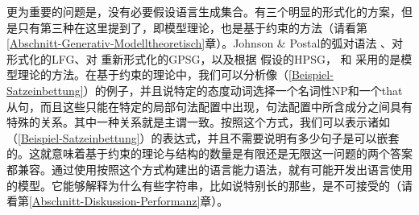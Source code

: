 更为重要的问题是，没有必要假设语言生成集合。有三个明显的形式化的方案，但是只有第三种在这里提到了，即模型理论，也是基于约束的方法（请看第\ref{Abschnitt-Generativ-Modelltheoretisch}章）。Johnson \& Postal的弧对语法
\citeyearpar{JP80a-u}、对 \citet{Kaplan95a}形式化的LFG\indexlfgc、对 \citet{Rogers97a}重新形式化的GPSG\indexgpsg，以及根据 \citet{King99a-u}假设的HPSG\indexhpsgc， \citet{Pollard99a}和 \citet{Richter2007a}采用的是模型理论的方法。在基于约束的理论中，我们可以分析像（\ref{Beispiel-Satzeinbettung}）的例子，并且说特定的态度动词选择一个名词性NP和一个that从句，而且这些只能在特定的局部句法配置中出现，句法配置中所含成分之间具有特殊的关系。其中一种关系就是主谓一致。按照这个方式，我们可以表示诸如（\ref{Beispiel-Satzeinbettung}）的表达式，并且不需要说明有多少句子是可以嵌套的。这就意味着基于约束的理论与结构的数量是有限还是无限这一问题的两个答案都兼容。通过使用按照这个方式构建出的语言能力语法，就有可能开发出语言使用的模型。它能够解释为什么有些字符串，比如说特别长的那些，是不可接受的（请看第\ref{Abschnitt-Diskussion-Performanz}章）。

